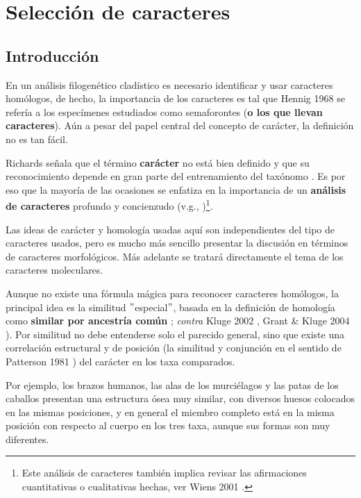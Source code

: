 \chapter{Selecci\'on de caracteres}
\section*{Introducci\'on}

En un an\'alisis filogen\'etico clad\'istico es necesario identificar y usar caracteres hom\'ologos, de hecho, la importancia de los caracteres es tal que Hennig 1968 se refer\'ia a los espec\'imenes estudiados como semaforontes \cite{} (\textbf{o los que llevan caracteres}). A\'un a pesar del papel central del concepto de car\'acter, la definici\'on no es tan f\'acil.


Richards se\~nala que el t\'ermino \textbf{car\'acter} no est\'a 
bien definido \cite[2003]{Richards} y que su reconocimiento depende en 
gran parte del entrenamiento del tax\'onomo \cite{Richards2002} . Es por 
eso que la mayor\'ia de las ocasiones se enfatiza en la importancia 
de un \textbf{an\'alisis de caracteres} profundo y concienzudo 
(v.g.,\cite[1968]{Hennig} \cite{Neff1986} \cite{R&K2001})\footnote
{Este an\'alisis de caracteres tambi\'en implica revisar las 
afirmaciones cuantitativas o cualitativas hechas, ver Wiens 2001 \cite{wiens2001}. 
}.

Las ideas de car\'acter y homolog\'ia usadas aqu\'i 
son independientes del tipo de caracteres usados, pero es mucho m\'as 
sencillo presentar la discusi\'on en t\'erminos de caracteres 
morfol\'ogicos. M\'as adelante se tratar\'a directamente el tema de los 
caracteres moleculares. 

Aunque no existe una f\'ormula m\'agica para reconocer caracteres hom\'ologos, 
la principal idea es la similitud $"$especial$"$, basada en 
la definici\'on de homolog\'ia como \textbf {similar por ancestr\'ia 
com\'un} \cite{R&K2001}; \textit {contra} Kluge 2002 \cite{kluge2002}, 
Grant \& Kluge 2004 \cite{Grant2004}). Por similitud no debe entenderse solo el 
parecido general, sino que existe una correlaci\'on estructural y de 
posici\'on (la similitud y conjunci\'on en el sentido de Patterson 
1981 \cite{Patterson1981}) del car\'acter en los taxa comparados. 

Por ejemplo, los brazos humanos, las alas de los murci\'elagos y las 
patas de los caballos presentan una estructura \'osea muy similar, 
con diversos huesos colocados en las mismas posiciones, y en general 
el miembro completo est\'a en la misma posici\'on con respecto al 
cuerpo en los tres taxa, aunque sus formas son muy diferentes. 


